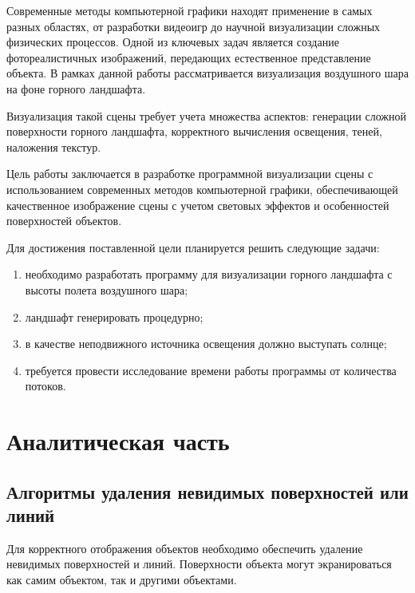 



\setcounter{page}{3}
\makeatletter
\renewcommand{\l@section}{\@dottedtocline{1}{0em}{2em}} %
\renewcommand{\l@subsection}{\@dottedtocline{2}{1em}{2.5em}} %
\makeatother
\renewcommand{\contentsname}{\hfill СОДЕРЖАНИЕ \hfill}
\tableofcontents

Современные методы компьютерной графики находят применение в самых разных областях, от разработки видеоигр до научной визуализации сложных физических процессов. Одной из ключевых задач является создание фотореалистичных изображений, передающих естественное представление объекта. В рамках данной работы рассматривается визуализация воздушного шара на фоне горного ландшафта.

Визуализация такой сцены требует учета множества аспектов: генерации сложной поверхности горного ландшафта, корректного вычисления освещения, теней, наложения текстур.

Цель работы заключается в разработке программной визуализации сцены с использованием современных методов компьютерной графики, обеспечивающей качественное изображение сцены с учетом световых эффектов и особенностей поверхностей объектов. 

Для достижения поставленной цели планируется решить следующие задачи:
\begin{enumerate}
\item необходимо разработать программу для визуализации горного ландшафта с высоты полета воздушного шара;
\item ландшафт генерировать процедурно;
\item в качестве неподвижного источника освещения должно выступать солнце;
\item требуется провести исследование времени работы программы от количества потоков.
\end{enumerate}

\chapter{Аналитическая часть}
\section{Алгоритмы удаления невидимых поверхностей или линий}
Для корректного отображения объектов необходимо обеспечить удаление невидимых поверхностей и линий. Поверхности объекта могут экранироваться как самим объектом, так и другими объектами.


